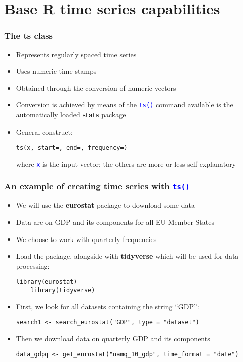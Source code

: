 \documentclass[10pt]{beamer}
\newcommand{\cc}[1]{\texttt{\textcolor{blue}{#1}}}
\theoremstyle{definition}
\begin{document}
\section{Base R time series capabilities}
\begin{frame}[fragile]
\frametitle{The \textbf{ts} class}
\begin{itemize}
	\item Represents regularly spaced time series
	\item Uses numeric time stamps
	\item Obtained through the conversion of numeric vectors
	\item Conversion is achieved by means of the \cc{ts()} command available is the automatically loaded \textbf{stats} package
	\item General construct:
	\begin{lstlisting}[style = rstyle, breaklines]
	ts(x, start=, end=, frequency=)
	\end{lstlisting}
	where \cc{x} is the input vector; the others are more or less self explanatory
\end{itemize}
\end{frame}

\begin{frame}[fragile]
\frametitle{An example of creating time series with \cc{ts()}}
\begin{itemize}
	\item We will use the \textbf{eurostat} package to download some data 
	\item Data are on GDP and its components for all EU Member States
	\item We choose to work with quarterly frequencies
	\item Load the package, alongside with \textbf{tidyverse} which will be used for data processing:
	
	\begin{lstlisting}[style = rstyle, breaklines]
	library(eurostat)
	library(tidyverse)	
	\end{lstlisting}
	
	\item First, we look for all datasets containing the string ``GDP'':

	\begin{lstlisting}[style = rstyle, breaklines]
	search1 <- search_eurostat("GDP", type = "dataset")
	\end{lstlisting}
	
	\item Then we download data on quarterly GDP and its components
	
	\begin{lstlisting}[style = rstyle, breaklines]
	data_gdpq <- get_eurostat("namq_10_gdp", time_format = "date")	
	\end{lstlisting}
\end{itemize}
\end{frame}
\end{document}
